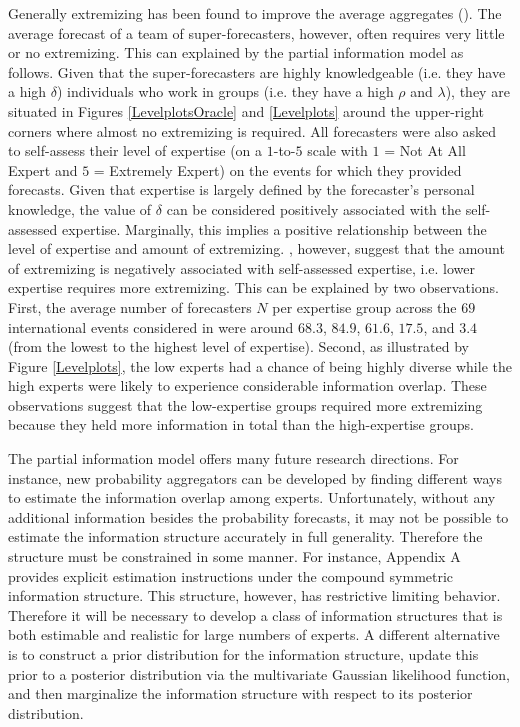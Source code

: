 \documentclass[11pt]{article}
\theoremstyle{definition}
\theoremstyle{definition}
\begin{document}
Generally extremizing has been found to improve the average aggregates (\citet{mellers2014psychological}). The average forecast of a team of super-forecasters, however, often requires very little or no extremizing. This can explained by the partial information model as follows. Given that the  super-forecasters are highly knowledgeable (i.e. they have a high $\delta$) individuals who work in groups (i.e. they have a high $\rho$ and $\lambda$), they are situated in Figures \ref{LevelplotsOracle} and \ref{Levelplots} around the upper-right corners where almost no extremizing is required. All forecasters were also asked to self-assess their level of expertise (on a $1$-to-$5$ scale with $1$ = Not At All Expert and $5$ = Extremely Expert) on the events for which they provided forecasts. Given that expertise is largely defined by the forecaster's personal knowledge, the value of $\delta$ can be considered positively associated with the self-assessed expertise. Marginally, this implies a positive relationship between the level of expertise and amount of extremizing. \citet{satopaa}, however, suggest that the amount of extremizing is negatively associated with self-assessed expertise, i.e. lower expertise requires more extremizing. This can be explained by two observations. First, the average number of forecasters $N$ per expertise group across the $69$ international events considered in \citet{satopaa} were around $68.3$, $84.9$, $61.6$, $17.5$, and $3.4$ (from the lowest to the highest level of expertise). Second, as illustrated by Figure \ref{Levelplots}, the low experts had a chance of being highly diverse while the high experts were likely to experience considerable information overlap. These observations suggest that the low-expertise groups required more extremizing because they held more information in total than the high-expertise groups.


The partial information model offers many future research directions. For instance, new probability aggregators can be developed by finding different ways  to estimate the information overlap among experts. Unfortunately, without any additional information besides the probability forecasts, it may not be possible to estimate the information structure accurately in full generality. Therefore the structure must be constrained in some manner. For instance, Appendix A provides explicit estimation instructions under the compound symmetric information structure. This structure, however, has restrictive limiting behavior. Therefore it will be necessary to develop a class of information structures that is  both estimable and realistic for large numbers of experts.  A different alternative is to construct a prior distribution for the information structure, update this prior to a posterior distribution via the multivariate Gaussian likelihood function, and then marginalize the information structure with respect to its posterior distribution. 
\end{document}
